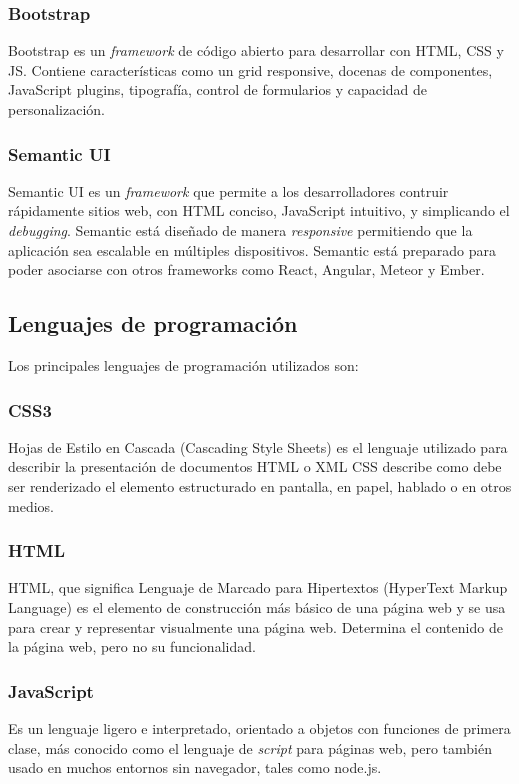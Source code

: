 \subsubsection{Bootstrap}
Bootstrap es un \textit{framework} de código abierto para desarrollar con HTML, CSS y JS. Contiene características como un grid responsive, docenas de componentes, JavaScript plugins, tipografía, control de formularios y capacidad de personalización\cite{bootstrap}.


\subsubsection{Semantic UI}
Semantic UI es un \textit{framework} que permite a los desarrolladores contruir rápidamente sitios web, con HTML conciso, JavaScript intuitivo, y simplicando el \textit{debugging}. Semantic está diseñado de manera \textit{responsive} permitiendo que la aplicación sea escalable en múltiples dispositivos. Semantic está preparado para poder asociarse con otros frameworks como React, Angular, Meteor y Ember\cite{semantic_github}.


\subsection{Lenguajes de programación}
Los principales lenguajes de programación utilizados son:


\subsubsection{CSS3}
Hojas de Estilo en Cascada (Cascading Style Sheets) es el lenguaje utilizado para describir la presentación de documentos HTML o XML CSS describe como debe ser renderizado el elemento estructurado en pantalla, en papel, hablado o en otros medios\cite{css_mozilla}.


\subsubsection{HTML}
HTML, que significa Lenguaje de Marcado para Hipertextos (HyperText Markup Language) es el elemento de construcción más básico de una página web y se usa para crear y representar visualmente una página web. Determina el contenido de la página web, pero no su funcionalidad\cite{html_mozilla}.


\subsubsection{JavaScript}
Es un lenguaje ligero e interpretado, orientado a objetos con funciones de primera clase, más conocido como el lenguaje de \textit{script} para páginas web, pero también usado en muchos entornos sin navegador, tales como node.js.


